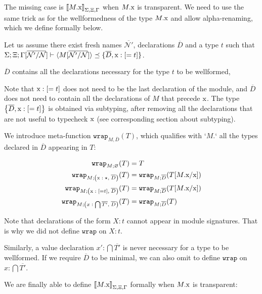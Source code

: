 \documentclass[12pt]{article}
\newcommand{\tx}{\text{\rm x}}
\newcommand{\Next}{\ensuremath{\mathcal{N}}}
\newcommand{\emptyenv}{\varnothing}
\newcommand{\Gammatop}{\ensuremath{\Xi}}
\newcommand{\Gammabot}{\ensuremath{\Gamma}}
\newcommand{\wrap}{\texttt{wrap}}
\begin{document}
The missing case is $\interp{M.\tx}$ when $M.\tx$ is transparent.
We need to use the same trick as for the wellformedness of the type $M.\tx$
and allow alpha-renaming, which we define formally below.

Let us assume there exist fresh names $\overline{\Next'}$,
declarations $\overline{D}$ and a type $t$
such that $\Sigma; \Gammatop; \Gammabot[\overline{\Next'/\Next}] \vdash  \langle M[\overline{\Next'/\Next}] \rangle \preceq \{ \overline{D}, \tx : [= t] \}$.

$\overline{D}$ contains all the declarations necessary for the type $t$ to be wellformed,

Note that $\tx : [= t]$ does not need to be the last declaration of the module, and $\overline{D}$ does not need
to contain all the declarations of $M$ that precede $\tx$. The type $\left\{ \overline{D}, \tx : [= t] \right\}$ is
obtained via subtyping, after removing all the declarations that are not useful to typecheck $\tx$ (see corresponding section about subtyping).

We introduce meta-function $\wrap_{M, \overline{D}}(T)$, which qualifies with `$M.$` all the types declared in $\overline{D}$ appearing in $T$:

\begin{align*}
    \wrap_{M; \emptyenv}(T)                                                   & = T                                     \\
    \wrap_{M; \left(\tx \;:\; \star,\; \overline{D}\right)}(T)                & = \wrap_{M; \overline{D}}(T[M.\tx/\tx]) \\
    \wrap_{M; \left(\tx \;:\; [= t],\;  \overline{D}\right)}(T)               & = \wrap_{M; \overline{D}}(T[M.\tx/\tx]) \\
    \wrap_{M; \left(x \;:\; \bigcap \overline{T'},\;  \overline{D}\right)}(T) & = \wrap_{M; \overline{D}}(T)            \\
\end{align*}

Note that declarations of the form $X : t$ cannot appear in module signatures.
That is why we did not define $\wrap$ on $X : t$.

Similarly, a value declaration $x' : \bigcap \overline{T'}$ is never necessary for a type
to be wellformed. If we require $\overline{D}$ to be minimal, we can also omit to define $\wrap$ on
$x : \bigcap \overline{T'}$.

We are finally able to define $\interp{M.\tx}$ formally when $M.\tx$ is transparent:
\end{document}
